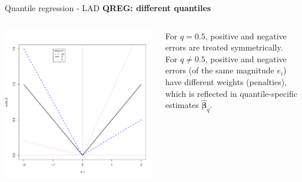 \documentclass{beamer}
\begin{document}
\begin{frame}{Quantile regression - LAD}
\textbf{\qquad QREG: different quantiles}
\begin{columns}
        \begin{column}{.7\textwidth}
            \includegraphics[width=1\textwidth]{img/B1_QREG.pdf}
        \end{column}
        \begin{column}{.3\textwidth}
        \tiny
            For $q= 0.5$, positive and negative errors are treated symmetrically. \\ \medskip For $q \neq 0.5$, positive and negative errors (of the same magnitude $e_i$) have different weights (penalties), which is reflected in quantile-specific estimates $\hat{\bm{\beta}}_q$.    
        \end{column}
    \end{columns}
\end{frame}
\end{document}
